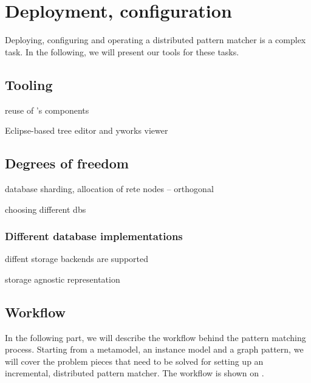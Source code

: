 \section{Deployment, configuration}
\label{sec:deployment-configuration}

Deploying, configuring and operating a distributed pattern matcher is a complex task. In the following, we will present our tools for these tasks. 

\subsection{Tooling}



reuse of \eiq's components

Eclipse-based tree editor and yworks viewer





\subsection{Degrees of freedom}

database sharding, allocation of rete nodes -- orthogonal

choosing different dbs

\subsubsection{Different database implementations}

diffent storage backends are supported

storage agnostic representation



\subsection{Workflow} %

In the following part, we will describe the workflow behind the pattern matching process. Starting from a metamodel, an instance model and a graph pattern, we will cover the problem pieces that need to be solved for setting up an incremental, distributed pattern matcher. The workflow is shown on .


